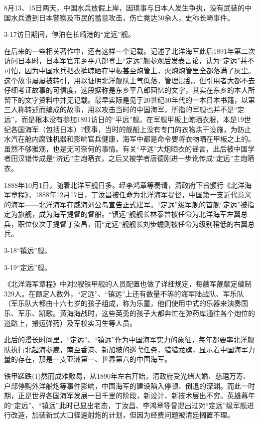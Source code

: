 \documentclass[12pt,UTF8]{ctexbook}
\begin{document}
8月13、15日两天，中国水兵放假上岸，因琐事与日本人发生争执，没有武装的中国水兵遭到日本警察及市民的蓄意攻击，伤亡竟达50余人，史称长崎事件。

3-17访日期间，停泊在长崎港的“定远”舰。

在后来的一些相关著作中，还有这样一个记载。记述了北洋海军此后1891年第二次访问日本时，日本军官东乡平八郎登上“定远”舰参观后发表言论，认为“定远”并不可怕，因为中国水兵把衣裤晾晒在甲板甚至炮管上，火炮炮管里全都落满了灰尘。这个故事屡屡被转引，用以证明北洋舰队士气低落，管理混乱。但引用者大都不去仔细考证故事的可信度，这段据称是东乡平八郎回忆的文字，其实在东乡的本人所留下的文字资料中并无记载。最早实际是见于20世纪30年代的一本日本书籍，以第三人称转述而编成的故事，用以攻击当时的中国海军，所指的军舰也并不是“定远”，而是根本没有参加1891访日的“平远”舰。在军舰甲板上晾晒衣服，本是19世纪各国海军（包括日本）?惯事，当时的舰船上没有专门的衣物烘干设施，为防止水汽在舱内腐蚀机器和影响官兵健康，海军中都是命令要将衣物晒在甲板之上的。虽然不够雅观，也是无可奈何的事情。有关“平远”大炮晒衣的谣言，此后被中国学者田汉错传成是“济远”主炮晒衣，之后又被学者唐德刚进一步讹传成“定远”主炮晒衣。

1888年10月1日，随着北洋军舰日多。经李鸿章等奏请，清政府下旨颁行《北洋海军章程》，1888年12月17日，丁汝昌被任命为北洋海军提督，中国第一支近代意义的海军——北洋海军在威海刘公岛宣告正式建军。“定远”级军舰的首舰“定远”被指定为旗舰，成为海军提督的督船。“镇远”舰舰长林泰曾被任命为北洋海军左翼总兵，职位仅次于提督丁汝昌，而“定远”舰舰长刘步蟾则被任命为级别稍低的右翼总兵。

3-18“镇远”舰。

3-19“定远”舰。

《北洋海军章程》中对2艘铁甲舰的人员配置也做了详细规定，每艘军舰额定编制329人。在额定人数外，“定远”、“镇远”上还有数量不等的海军陆战队、军乐队（军乐队大都由十六七岁的孩子组成，称为乐童，他们使用中式的乐器来演奏国乐、军乐、凯歌。黄海海战时，这些英勇的孩子大都奔忙在弹药库通往各个炮位的道路上，搬运弹药）及军校实习生等人员。

此后的漫长时间里，“定远”、“镇远”作为中国海军实力的象征，每年都要率北洋舰队执行北起海参崴，南至香港、新加坡的巡弋任务，猎猎龙旗，显示着中国海军力量的存在，那是一支亚洲第一、世界第六的中国海军。

铁甲蹉跌(1)然而成难败易，从1890年左右开始，清政府受光绪大婚、慈禧万寿、户部停购外洋船炮等事件影响，中国海军的建设陷入停顿、倒退的深渊。而此一时期，正是世界各国海军发展一日千里的阶段，新设计、新技术层出不穷。英雄暮年的“定远”、“镇远”此时已显出老态，丁汝昌、李鸿章等曾提出过对“定远”级军舰进行改造，加装新式大口径速射炮的计划，但因为经费问题被清廷搁置不理。
\end{document}
